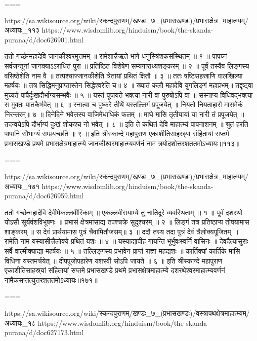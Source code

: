 ===

https://sa.wikisource.org/wiki/स्कन्दपुराणम्/खण्डः_७_(प्रभासखण्डः)/प्रभासक्षेत्र_माहात्म्यम्/अध्यायः_११३
https://www.wisdomlib.org/hinduism/book/the-skanda-purana/d/doc626901.html


ततो गच्छेन्महादेवि जानकीश्वरमुत्तमम् ॥
रामेशान्नैऋते भागे धनुस्त्रिंशकसंस्थितम् ॥ १ ॥
पापघ्नं सर्वजन्तूनां जानक्याऽऽराधितं पुरा ॥
प्रतिष्ठितं विशेषेण सम्यगाराध्यशङ्करम् ॥ २ ॥
पूर्वं तस्यैव लिङ्गस्य वसिष्ठेशेति नाम वै ॥
तत्पश्चाज्जानकीशेति त्रेतायां प्रथितं क्षितौ ॥ ३ ॥
ततः षष्टिसहस्राणि वालखिल्या महर्षयः ॥
तत्र सिद्धिमनुप्राप्तास्तेन सिद्धेश्वरेति च॥ ४ ॥
ख्यातं कलौ महादेवि युगलिङ्गं महाप्रभम्॥
तद्दृष्ट्वा मुच्यते पापैर्दुःखदौर्भाग्यसम्भवैः ॥ ५ ॥
यस्तं पूजयते भक्त्या नारी वा पुरुषोऽपि वा ॥
संस्नाप्य विधिवद्भक्त्या स मुक्तः पातकैर्भवेत् ॥ ६ ॥
स्नात्वा च पुष्करे तीर्थे यस्तल्लिगं प्रपूजयेत् ॥
नियतो नियताहारो मासमेकं निरन्तरम्॥ ७ ॥
दिनेदिने भवेत्तस्य वाजिमेधाधिकं फलम् ॥
माघे मासि तृतीयायां या नारी तं प्रपूजयेत् ॥
तदन्वयेऽपि दौर्भाग्यं दुःखं शोकश्च नो भवेत् ॥ ८ ॥
इति ते कथितं देवि माहात्म्यं पापनाशनम् ॥
श्रुतं हरति पापानि सौभाग्यं सम्प्रयच्छति ॥ ९ ॥
इति श्रीस्कान्दे महापुराण एकाशीतिसाहस्र्यां संहितायां सप्तमे प्रभासखण्डे प्रथमे प्रभासक्षेत्रमाहात्म्ये जानकीश्वरमाहात्म्यवर्णनं नाम त्रयोदशोत्तरशततमोऽध्यायः॥११३॥

===

https://sa.wikisource.org/wiki/स्कन्दपुराणम्/खण्डः_७_(प्रभासखण्डः)/प्रभासक्षेत्र_माहात्म्यम्/अध्यायः_१७१
https://www.wisdomlib.org/hinduism/book/the-skanda-purana/d/doc626959.html


ततो गच्छेन्महादेवि देवीमेकल्लवीरिकाम् ॥
एकल्लवीरायाम्ये तु नातिदूरे व्यवस्थिताम् ॥ १ ॥
पूर्वं दशरथो योऽसौ सूर्यवंशविभूषणः ॥
प्रभासं क्षेत्रमासाद्य तपश्चक्रे सुदुश्चरम् ॥ २ ॥
लिङ्गं तत्र प्रतिष्ठाप्य तोषयामास शाङ्करम् ॥
स देवं प्रार्थयामास पुत्रं चैवामितौजसम्॥ ३ ॥
ददौ तस्य तदा पुत्रं देवं त्रैलोक्यपूजितम् ॥
रामेति नाम यस्यासीत्त्रैलोक्ये प्रथितं यशः ॥ ४ ॥
यस्याद्यापीह गायन्ति भूर्भुवःस्वर्नि वासिनः ॥
देवदैत्यासुराः सर्वे वाल्मीक्याद्या महर्षयः ॥ ५ ॥
तल्लिङ्गस्य प्रभावेन प्राप्तं राज्ञा महद्यशः ॥
कार्तिक्यां कार्तिके मासि विधिना यस्तमर्चयेत् ॥
दीपपूजोपहारेण यशस्वी सोऽपि जायते ॥ ६ ॥
इति श्रीस्कान्दे महापुराण एकाशीतिसाहस्र्यां संहितायां सप्तमे प्रभासखण्डे प्रथमे प्रभासक्षेत्रमाहात्म्ये दशरथेश्वरमाहात्म्यवर्णनं नामैकसप्तत्युत्तरशततमोऽध्यायः॥१७१॥

===

https://sa.wikisource.org/wiki/स्कन्दपुराणम्/खण्डः_७_(प्रभासखण्डः)/वस्त्रापथक्षेत्रमाहात्म्यम्/अध्यायः_१८
https://www.wisdomlib.org/hinduism/book/the-skanda-purana/d/doc627173.html

